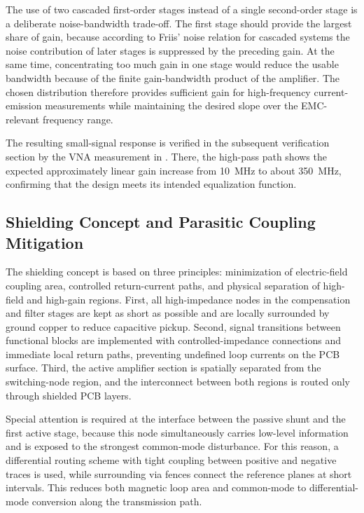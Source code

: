 The use of two cascaded first-order stages instead of a single second-order stage is a deliberate noise-bandwidth trade-off.
The first stage should provide the largest share of gain, because according to Friis' noise relation for cascaded systems the noise contribution of later stages is suppressed by the preceding gain.
At the same time, concentrating too much gain in one stage would reduce the usable bandwidth because of the finite gain-bandwidth product of the amplifier.
The chosen distribution therefore provides sufficient gain for high-frequency current-emission measurements while maintaining the desired slope over the EMC-relevant frequency range.

The resulting small-signal response is verified in the subsequent verification section by the VNA measurement in .
There, the high-pass path shows the expected approximately linear gain increase from \SI{10}{MHz} to about \SI{350}{MHz}, confirming that the design meets its intended equalization function.


\subsection{Shielding Concept and Parasitic Coupling Mitigation}

The shielding concept is based on three principles: minimization of electric-field coupling area, controlled return-current paths, and physical separation of high-field and high-gain regions.
First, all high-impedance nodes in the compensation and filter stages are kept as short as possible and are locally surrounded by ground copper to reduce capacitive pickup.
Second, signal transitions between functional blocks are implemented with controlled-impedance connections and immediate local return paths, preventing undefined loop currents on the PCB surface.
Third, the active amplifier section is spatially separated from the switching-node region, and the interconnect between both regions is routed only through shielded PCB layers.

Special attention is required at the interface between the passive shunt and the first active stage, because this node simultaneously carries low-level information and is exposed to the strongest common-mode disturbance.
For this reason, a differential routing scheme with tight coupling between positive and negative traces is used, while surrounding via fences connect the reference planes at short intervals.
This reduces both magnetic loop area and common-mode to differential-mode conversion along the transmission path.

